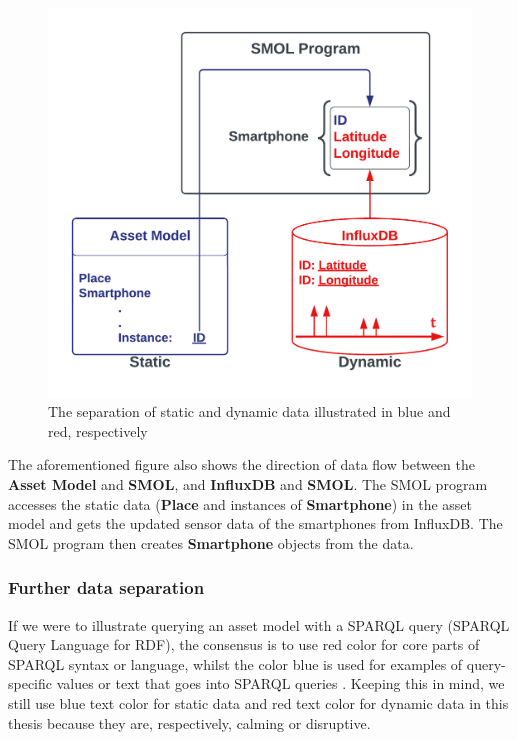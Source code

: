\documentclass{article}
\begin{document}
\begin{figure}[H]
    \centering
    \includegraphics[scale=0.18]{graphics/static_dynamic_asset_model.png}
    \caption{The separation of static and dynamic data illustrated in blue and red, respectively}
    \label{fig:static_dynamic_asset_model}
\end{figure}

The aforementioned figure also shows the direction of data flow between the \textbf{Asset Model} and \textbf{SMOL}, and \textbf{InfluxDB} and \textbf{SMOL}. The SMOL program accesses the static data (\textbf{Place} and instances of \textbf{Smartphone}) in the asset model and gets the updated sensor data of the smartphones from InfluxDB. The SMOL program then creates \textbf{Smartphone} objects from the data.


\subsubsection{Further data separation}\label{subsubsec:FurtherDataSeparation}
If we were to illustrate querying an asset model with a SPARQL query (SPARQL Query Language for RDF), the consensus is to use red color for core parts of SPARQL syntax or language, whilst the color blue is used for examples of query-specific values or text that goes into SPARQL queries \cite{noauthor_sparql_nodate}. Keeping this in mind, we still use blue text color for static data and red text color for dynamic data in this thesis because they are, respectively, calming or disruptive. 
\end{document}
